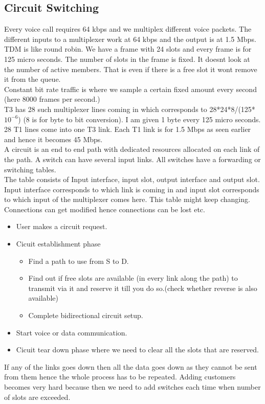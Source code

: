 \documentclass[solution,addpoints,12pt]{exam}
\begin{document}
\subsection{Circuit Switching}
Every voice call requires 64 kbps and we multiplex different voice packets.
The different inputs to a multiplexer work at 64 kbps and the output is at 1.5
Mbps.
TDM is like round robin. We have a frame with 24 slots and every frame is for
125 micro seconds. The number of slots in the frame is fixed. It doesnt look
at the number of active members. That is even if there is a free slot it wont
remove it from the queue.\\
Constant bit rate traffic is where we sample a certain fixed amount every second
(here 8000 frames per second.)\\
T3 has 28 such multiplexer lines coming in which corresponds to
28*24*8/(125*$10^{-6}$) (8 is for byte to bit conversion).
I am given 1 byte every 125 micro seconds.
28 T1 lines come into one T3 link. Each T1 link is for 1.5 Mbps as seen earlier
and hence it becomes 45 Mbps.\\
A circuit is an end to end path with dedicated resources allocated
on each link of the path. A switch can have several input links.
All switches have a forwarding or switching tables.\\
The table consists of Input interface, input slot, output interface and
output slot. Input interface corresponds to which link is coming in and
input slot corresponds to which input of the multiplexer comes here.
This table might keep changing.\\
Connections can get modified hence connections can be lost etc.
\begin{itemize}
\item User makes a circuit request.
\item
Cicuit establishment phase
\begin{itemize}
\item Find a path to use from S to D.
\item Find out if free slots are available (in every link along the path) to
transmit via it and reserve it till you do so.(check whether reverse is also
available)
\item Complete bidirectional circuit setup.
\end{itemize}
\item
Start voice or data communication.
\item
Cicuit tear down phase where we need to clear all the slots that are reserved.
\end{itemize}
If any of the links goes down then all the data goes down as they cannot be sent
from them hence the whole process has to be repeated.
Adding customers becomes very hard because then we need to add switches each
time when number of slots are exceeded.\\
\end{document}
